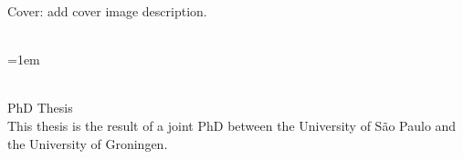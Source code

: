 \thispagestyle{empty}

\hyphenation{}

\null
\vfill

\noindent Cover: add cover image description.
\vspace{1.5cm}

\noindent\myTitle\\
\hangindent=1em \mySubtitle

\noindent \myName\\
PhD Thesis\\

\vspace{1.5cm}
\noindent This thesis is the result of a joint PhD between the University of São Paulo and the University of Groningen. \\

\vspace{1.5cm}


